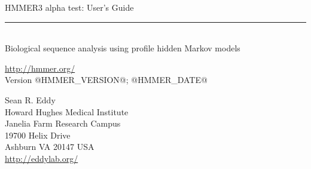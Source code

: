 \begin{titlepage}
{\Large

\vspace*{\fill}

\noindent
{\Huge {HMMER3 alpha test: User's Guide}} \vspace{-8.0pt} \\ 
\rule[2pt]{\textwidth}{1pt} \\
\hspace*{\fill} {\large {Biological sequence analysis using
profile hidden Markov models} \\ }

\vspace*{\fill}

\begin{center}
\url{http://hmmer.org/}\\
Version @HMMER_VERSION@; @HMMER_DATE@ \\ 

\vspace*{\fill}

Sean R. Eddy\\
Howard Hughes Medical Institute\\
Janelia Farm Research Campus\\
19700 Helix Drive\\
Ashburn VA 20147 USA\\
\url{http://eddylab.org/} \\
\end{center}

\vspace*{\fill}

}
\end{titlepage}
